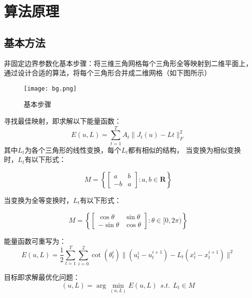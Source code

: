 \documentclass[14pt]{scrartcl} %
\begin{document}
\pagebreak
\section{算法原理}

\subsection{基本方法}
非固定边界参数化基本步骤：将三维三角网格每个三角形全等映射到二维平面上，通过设计合适的算法，将每个三角形合并成二维网格（如下图所示）
\begin{figure}[h] %
	\centering
	\texttt{[image: bg.png]} %
	\caption{基本步骤 }
\end{figure}

寻找最佳映射，即求解以下能量函数：
\begin{equation}
E(u,L)=\sum\limits^T_{t=1}A_t\|J_t(u)-Lt\|^2_F
\end{equation}
其中$L_t$为各个三角形的线性变换，每个$L_t$都有相似的结构，
当变换为相似变换时，$L_t$有以下形式：

\begin{equation}
M=\left\{\begin{bmatrix}a&b\\-b&a\end{bmatrix}:a,b\in \boldsymbol R \right\}
\end{equation}

当变换为全等变换时，$L_t$有以下形式：

\begin{equation}
M=\left\{\begin{bmatrix}\cos\theta&\sin\theta\\-\sin\theta&\cos\theta\end{bmatrix}:\theta\in [0,2\pi) \right\}
\end{equation}

能量函数可重写为：
\begin{equation}
E(u,L)=\frac{1}{2}\sum\limits^T_{t=1}\sum\limits^2_{i=0}\cot(\theta_t^i)\|(u^i_t-u_t^{i+1})-L_t(x_t^i-x_t^{i+1})\|^2
\end{equation}

目标即求解最优化问题：
\begin{equation}
(u,L)=\arg\min_{(u,L)}E(u,L)\ \ s.t.\ \ L_t\in M
\end{equation}
\end{document}
